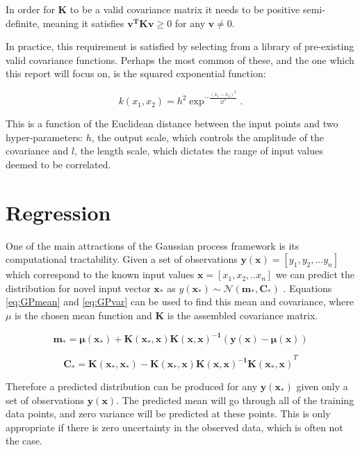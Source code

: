 \documentclass[a4paper,11pt]{report}
\begin{document}
In order for \(\mathbf{K}\) to be a valid covariance matrix it needs to be positive semi-definite, meaning it satisfies \( \mathbf{v^{T} K v} \geq 0\) for any \( \mathbf{v} \neq 0 \).

In practice, this requirement is satisfied by selecting from a library of pre-existing valid covariance functions. Perhaps the most common of these, and the one which this report will focus on, is the squared exponential function:

\begin{equation}
k(x_1,x_2) = h^2 \exp^{- \frac{(x_1-x_2)^2}{2 l^2}}.
\end{equation} 

This is a function of the Euclidean distance between the input points and two hyper-parameters: \(h\), the output scale, which controls the amplitude of the covariance and \(l\), the length scale, which dictates the range of input values deemed to be correlated. 

\section{Regression}

One of the main attractions of the Gaussian process framework is its computational tractability. Given a set of observations \( \mathbf{y}( \mathbf{x} ) = [y_1, y_2, ... y_n] \) which correspond to the known input values \( \mathbf{x} = [x_1, x_2, .. x_n] \) we can predict the distribution for novel input vector \( \mathbf{x_*} \) as \( y( \mathbf{x_*}) \sim \mathcal{N}(\mathbf{m_*,C_*}) \) \cite{GP-robots}. Equations \ref{eq:GPmean} and \ref{eq:GPvar} can be used to find this mean and covariance, where \(\mu\) is the chosen mean function and \(\mathbf{K}\) is the assembled covariance matrix.

\singlespacing

\begin{equation} \label{eq:GPmean}
\mathbf{m_* = \mu (x_*) + K(x_* ,x) K(x,x)^{-1} (y(x) - \mu (x))}
\end{equation}

\begin{equation} \label{eq:GPvar}
\mathbf{C_* = K(x_*,x_*)-K(x_*,x) K(x,x)^{-1} K(x_*,x)}^{T}
\end{equation}

\doublespacing

Therefore a predicted distribution can be produced for any \(\mathbf{y(x_*)}\) given only a set of observations \(\mathbf{y(x)}\). The predicted mean will go through all of the training data points, and zero variance will be predicted at these points. This is only appropriate if there is zero uncertainty in the observed data, which is often not the case.
\end{document}

